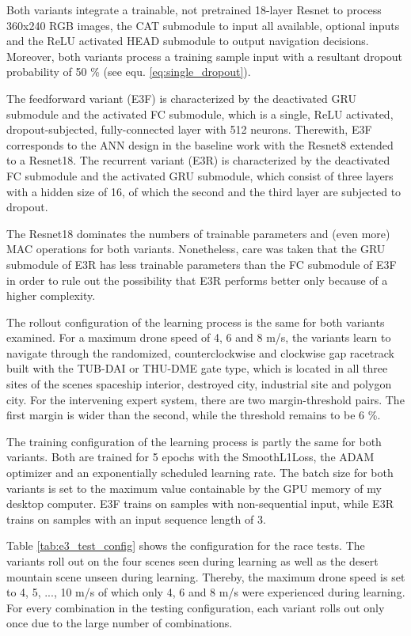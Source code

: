 Both variants integrate a trainable,
not pretrained 18-layer Resnet
to process 360x240 RGB images,
the CAT submodule to input 
all available, optional inputs
and the ReLU activated HEAD submodule 
to output navigation decisions.
Moreover, both variants process a training sample 
input with a resultant dropout probability of 
50 \% (see equ. \ref{eq:single_dropout}).

The feedforward variant (E3F)
is characterized by the deactivated GRU submodule
and the activated FC submodule,
which is a single, ReLU activated,
dropout-subjected, fully-connected layer with 512 neurons.
Therewith, 
E3F corresponds to the ANN design in the baseline work
with the Resnet8 extended to a Resnet18.
The recurrent variant (E3R)
is characterized by the deactivated FC submodule
and the activated GRU submodule,
which consist of three layers with a hidden size of 16, of
which the second and the third layer are subjected to dropout.

The Resnet18 dominates the numbers of trainable parameters
and (even more) MAC operations for both variants.
Nonetheless, care was taken that the
GRU submodule of E3R
has less trainable parameters
than the FC submodule of E3F
in order to rule out
the possibility that E3R performs 
better only because of a higher complexity.

The rollout configuration of the learning process 
is the same for both variants examined.
For a maximum drone speed of 
4, 6 and 8 m/s,
the variants learn to navigate 
through the randomized, counterclockwise 
and clockwise gap racetrack 
built with the TUB-DAI or THU-DME gate type,
which is located in all three sites of the scenes
spaceship interior, destroyed city,
industrial site and polygon city.
For the intervening expert system,
there are two margin-threshold pairs.
The first margin is wider than the second,
while the threshold remains to be 6 \%.


The training configuration of the learning process 
is partly the same for both variants.
Both are trained for 5 epochs 
with the SmoothL1Loss, the ADAM optimizer
and an exponentially scheduled learning rate.
The batch size for both variants 
is set to the maximum value containable by the GPU
memory of my desktop computer.
E3F trains on samples with non-sequential input,
while E3R trains on samples with an input sequence length
of 3.

Table \ref{tab:e3_test_config} shows the configuration for the race tests.
The variants roll out on the four scenes seen during learning
as well as the desert mountain scene unseen during learning.
Thereby, the maximum drone speed is set to 
4, 5, ..., 10 m/s  of which only 4, 6 and 8 m/s
were experienced during learning.
For every combination in the testing configuration,
each variant rolls out only once
due to the large number of combinations.

